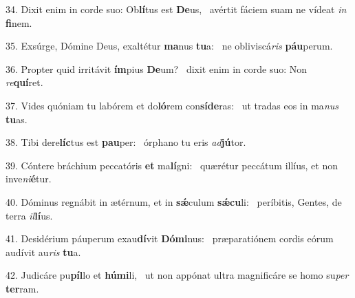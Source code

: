 34. Dixit enim in corde suo: Ob\textbf{lí}tus est \textbf{De}us, \ast\  avértit fáciem suam ne vídeat \textit{in} \textbf{fi}nem.\

35. Exsúrge, Dómine Deus, exaltétur \textbf{ma}nus \textbf{tu}a: \ast\  ne obliviscá\textit{ris} \textbf{páu}perum.\

36. Propter quid irritávit \textbf{ím}pius \textbf{De}um? \ast\  dixit enim in corde suo: Non \textit{re}\textbf{quí}ret.\

37. Vides quóniam tu labórem et do\textbf{ló}rem con\textbf{sí}\textbf{de}ras: \ast\  ut tradas eos in ma\textit{nus} \textbf{tu}as.\

38. Tibi dere\textbf{líc}tus est \textbf{pau}per: \ast\  órphano tu eris \textit{ad}\textbf{jú}tor.\

39. Cóntere bráchium peccatóris \textbf{et} ma\textbf{lí}gni: \ast\  quærétur peccátum illíus, et non inve\textit{ni}\textbf{é}tur.\

40. Dóminus regnábit in ætérnum, et in \textbf{sǽ}culum \textbf{sǽ}\textbf{cu}li: \ast\  períbitis, Gentes, de terra \textit{il}\textbf{lí}us.\

41. Desidérium páuperum exau\textbf{dí}vit \textbf{Dó}\textbf{mi}nus: \ast\  præparatiónem cordis eórum audívit au\textit{ris} \textbf{tu}a.\

42. Judicáre pu\textbf{píl}lo et \textbf{hú}\textbf{mi}li, \ast\  ut non appónat ultra magnificáre se homo su\textit{per} \textbf{ter}ram.\

